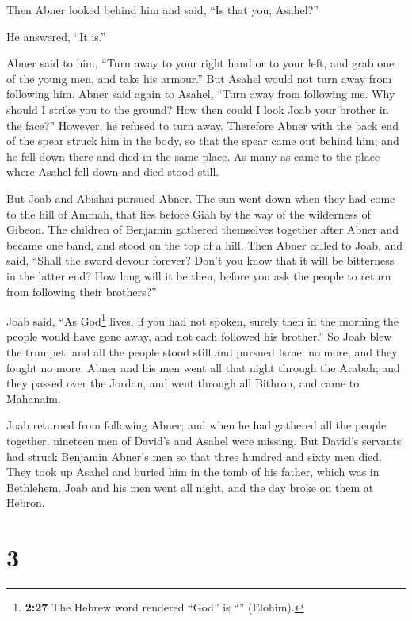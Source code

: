 Then Abner looked behind him and said, ``Is that you,
Asahel?''

He answered, ``It is.''

 Abner said to him, ``Turn away to your right hand or to
your left, and grab one of the young men, and take his armour.'' But
Asahel would not turn away from following him.  Abner
said again to Asahel, ``Turn away from following me. Why should I strike
you to the ground? How then could I look Joab your brother in the
face?''  However, he refused to turn away. Therefore
Abner with the back end of the spear struck him in the body, so that the
spear came out behind him; and he fell down there and died in the same
place. As many as came to the place where Asahel fell down and died
stood still.

 But Joab and Abishai pursued Abner. The sun went down
when they had come to the hill of Ammah, that lies before Giah by the
way of the wilderness of Gibeon.  The children of
Benjamin gathered themselves together after Abner and became one band,
and stood on the top of a hill.  Then Abner called to
Joab, and said, ``Shall the sword devour forever? Don't you know that it
will be bitterness in the latter end? How long will it be then, before
you ask the people to return from following their brothers?''

 Joab said, ``As God\footnote{\textbf{2:27} The Hebrew
  word rendered ``God'' is ``'' (Elohim).} lives, if you
had not spoken, surely then in the morning the people would have gone
away, and not each followed his brother.''  So Joab blew
the trumpet; and all the people stood still and pursued Israel no more,
and they fought no more.  Abner and his men went all that
night through the Arabah; and they passed over the Jordan, and went
through all Bithron, and came to Mahanaim.

 Joab returned from following Abner; and when he had
gathered all the people together, nineteen men of David's and Asahel
were missing.  But David's servants had struck Benjamin
Abner's men so that three hundred and sixty men died. 
They took up Asahel and buried him in the tomb of his father, which was
in Bethlehem. Joab and his men went all night, and the day broke on them
at Hebron.

\hypertarget{section-2}{%
\section{3}\label{section-2}}

